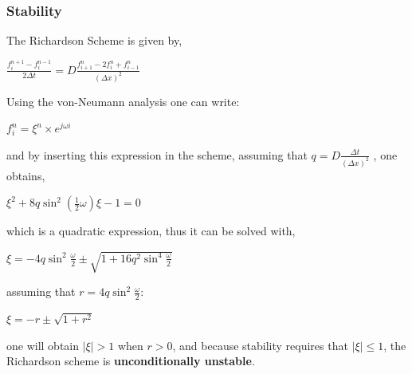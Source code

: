 \documentclass[12pt]{report}
\begin{document}
\subsubsection*{Stability}

\par The Richardson Scheme is given by,

\begin{center}
\Large
$
\frac{f_i^{n + 1} - f_i^{n - 1}}{2 \Delta t} = D \frac{f_{i + 1}^{n} - 2f_{i}^{n} + f_{i - 1}^{n}}{(\Delta x)^2}
$
\end{center}

\par Using the von-Neumann analysis one can write:

\begin{center}
\large
$ 
f_i^{n} = \xi^n \times e^{j \omega i}
$
\end{center}

\par and by inserting this expression in the scheme, assuming that $ q = D \frac{\Delta t}{(\Delta x)^2}$ , one obtains, 

\begin{center}
\large
$ 
	\xi ^2 + 8 q \sin ^2( \frac{1}{2} \omega) \xi - 1 = 0
$
\end{center}

which is a quadratic expression, thus it can be solved with,

\begin{center}
\large
$ 
	\xi = -4 q \sin ^2 \frac{\omega}{2} \pm \sqrt{1 + 16 q ^2 \sin ^4 \frac{\omega}{2}}
$
\end{center}

assuming that $r = 4 q \sin ^2 \frac{\omega}{2} $:

\begin{center}
\large
$ 
	\xi = -r \pm \sqrt{1 + r ^2}
$
\end{center}

one will obtain $\lvert \xi \lvert > 1$  when $r > 0$, and because stability requires that $\lvert \xi \lvert \le 1 $, the Richardson scheme is \textbf{unconditionally unstable}.






\end{document}
